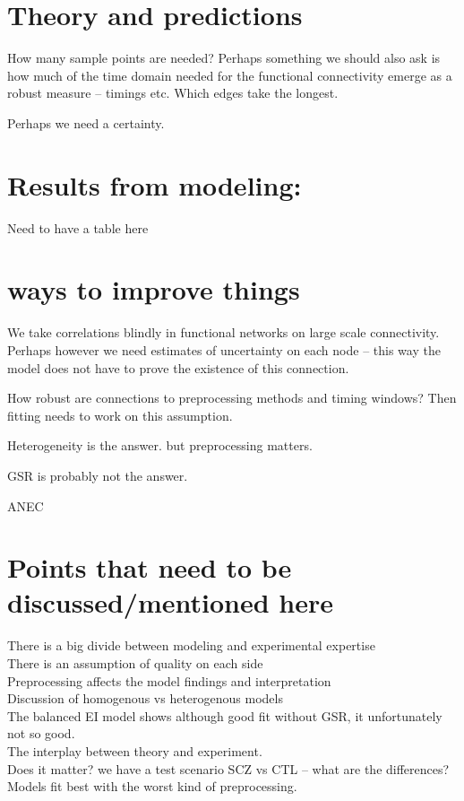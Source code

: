 \documentclass[oneside]{./zHenriquesLab-StyleBioRxiv}
\begin{document}
\section*{Theory and predictions}

How many sample points are needed?
Perhaps something we should also ask is how much of the time domain needed for the functional connectivity emerge as a robust measure -- timings etc. Which edges take the longest.

Perhaps we need a certainty. 

\section*{Results from modeling:}
Need to have a table here

\section*{ways to improve things}
We take correlations blindly in functional networks on large scale connectivity. Perhaps however we need estimates of uncertainty on each node -- this way the model does not have to prove the existence of this connection. 

How robust are connections to preprocessing methods and timing windows? Then fitting needs to work on this assumption.

Heterogeneity is the answer. but preprocessing matters. 

GSR is probably not the answer.

ANEC

\section*{Points that need to be discussed/mentioned here}

There is a big divide between modeling and experimental expertise \\
There is an assumption of quality on each side \\
Preprocessing affects the model findings and interpretation \\
Discussion of homogenous vs heterogenous models\\
The balanced EI model shows although good fit without GSR, it unfortunately not so good. \\
The interplay between theory and experiment. \\
Does it matter? we have a test scenario SCZ vs CTL -- what are the differences? \\
Models fit best with the worst kind of preprocessing.
\end{document}
